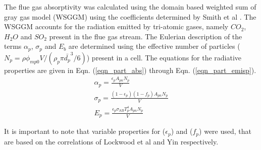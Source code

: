 \documentclass[11pt,cleanfoot]{asme2ej}
\begin{document}
The flue gas absorptivity was calculated using the domain based weighted sum of gray gas model (WSGGM) using the coefficients determined by Smith et al \cite{Smith1982}. The WSGGM accounts for the radiation emitted by tri-atomic gases, namely $CO_2$, $H_2O$ and $SO_2$ present in the flue gas stream. The Eulerian description of the terms $\alpha_p$, $\sigma_p$ and $E_b$ are determined using the effective number of particles ($N_p = \rho \phi_{mp0} V / \left( \rho_p \pi \bar{d_p}^3 /6 \right)$) present in a cell. The equations for the radiative properties are given in Eqn. (\ref{eqn_part_abs}) through Eqn. (\ref{eqn_part_emisp}).
\begin{gather}
\alpha_p = \frac{\epsilon_p A_{pn}N_p}{V} \label{eqn_part_abs}\\
\sigma_p = \frac{(1-\epsilon_p)(1-f_p) A_{pn}N_p}{V} \label{eqn_part_scat} \\
E_p = \frac{\epsilon_p \sigma_{SB} T_p^4 A_{pn}N_p}{V}\label{eqn_part_emisp}
\end{gather}

It is important to note that variable properties for ($\epsilon_p$) and ($f_p$) were used, that are based on the correlations of Lockwood et al \cite{Lockwood1986} and Yin \cite{Yin2015} respectively.
\end{document}

